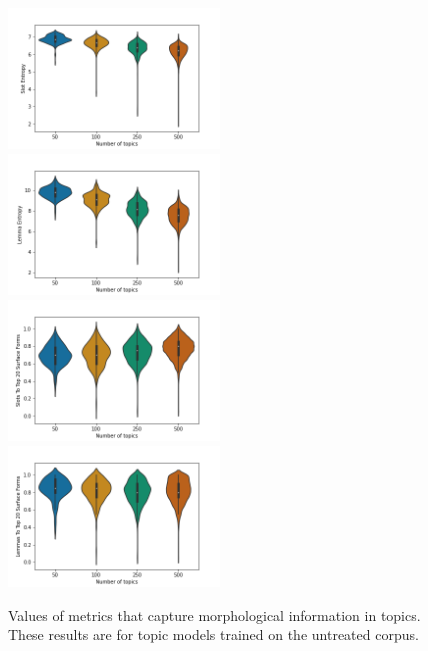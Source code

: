 \documentclass[11pt,a4paper]{article}
\begin{document}
\begin{figure}[t]
    \includegraphics[width=0.5\textwidth]{unweighted_slot_entropy.png}
    \includegraphics[width=0.5\textwidth]{unweighted_lemma_entropy.png}
    \includegraphics[width=0.5\textwidth]{slots_to_top_20_surface_forms.png}
    \includegraphics[width=0.5\textwidth]{lemmas_to_top_20_surface_forms.png}
    \caption{Values of metrics that capture morphological information in topics. These results are for topic models trained on the untreated corpus.}
    \label{fig:slot_lemma_figs}
\end{figure}
\end{document}
